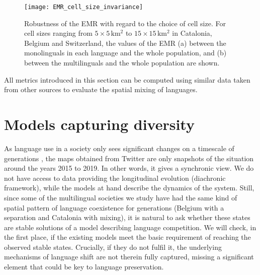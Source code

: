 \documentclass[../thesis.tex]{subfiles}
\begin{document}
\begin{figure}[h!]
    \centering
    \texttt{[image: EMR\_cell\_size\_invariance]}
    \caption{Robustness of the \ac{EMR} with regard to the choice of cell size. For cell
    sizes ranging from $5 \times 5 \, \si{\kilo \meter \squared}$ to $15 \times 15 \,
    \si{\kilo \meter \squared}$ in Catalonia, Belgium and Switzerland, the values of the
    \ac{EMR} (a) between the monolinguals in each language and the whole population, and
    (b) between the multilinguals and the whole population are shown.}
    \label{fig:EMR_cell_size_invariance}
\end{figure}

All metrics introduced in this section can be computed using similar data taken from
other sources to evaluate the spatial mixing of languages.



\section{Models capturing diversity}
\label{sec:multiling_models}
As language use in a society only sees significant changes on a timescale of generations
\cite{LabovSociolinguisticPatterns1973}, the maps obtained from Twitter are only
snapshots of the situation around the years 2015 to 2019. In other words, it gives a
synchronic view. We do not have access to data providing the longitudinal evolution
(diachronic framework), while the models at hand describe the dynamics of the system.
Still, since some of the multilingual societies we study have had the same kind of
spatial pattern of language coexistence for generations (Belgium with a separation and
Catalonia with mixing), it is natural to ask whether these states are stable solutions
of a model describing language competition. We will check, in the first place, if the
existing models meet the basic requirement of reaching the observed stable states.
Crucially, if they do not fulfil it, the underlying mechanisms of language shift are not
therein fully captured, missing a significant element that could be key to language
preservation.
\end{document}
